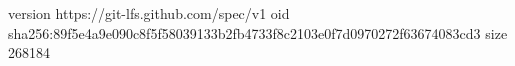 version https://git-lfs.github.com/spec/v1
oid sha256:89f5e4a9e090c8f5f58039133b2fb4733f8c2103e0f7d0970272f63674083cd3
size 268184
